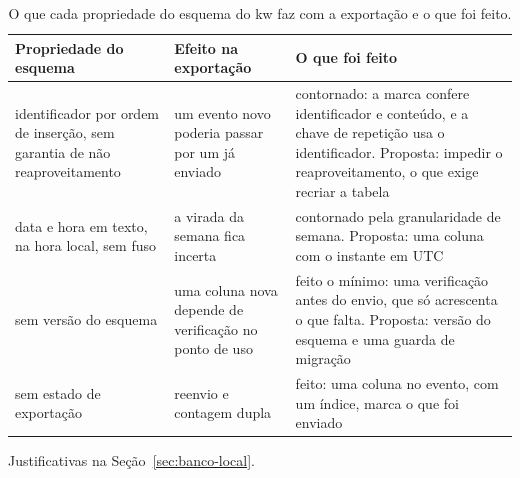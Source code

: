 \begin{table}[!ht]
  \centering
  \footnotesize
  \setlength{\tabcolsep}{4pt}
  \begin{threeparttable}
    \caption{O que cada propriedade do esquema do kw faz com a exportação e o
      que foi feito.}
    \label{tab:esquema}
    \begin{tabular}{@{}>{\raggedright\arraybackslash}p{4.0cm}
                      >{\raggedright\arraybackslash}p{3.8cm}
                      >{\raggedright\arraybackslash}p{6.4cm}@{}}
      \toprule
      Propriedade do esquema & Efeito na exportação & O que foi feito \\
      \midrule
      identificador por ordem de inserção, sem garantia de não reaproveitamento
        & um evento novo poderia passar por um já enviado
        & contornado: a marca confere identificador e conteúdo, e a chave de
          repetição usa o identificador. Proposta: impedir o reaproveitamento,
          o que exige recriar a tabela \\
      \addlinespace
      data e hora em texto, na hora local, sem fuso
        & a virada da semana fica incerta
        & contornado pela granularidade de semana. Proposta: uma coluna com o
          instante em UTC \\
      \addlinespace
      sem versão do esquema
        & uma coluna nova depende de verificação no ponto de uso
        & feito o mínimo: uma verificação antes do envio, que só acrescenta o que
          falta. Proposta: versão do esquema e uma guarda de migração \\
      \addlinespace
      sem estado de exportação
        & reenvio e contagem dupla
        & feito: uma coluna no evento, com um índice, marca o que foi enviado \\
      \bottomrule
    \end{tabular}
    \begin{tablenotes}
      \footnotesize
      \item Justificativas na Seção~\ref{sec:banco-local}.
    \end{tablenotes}
  \end{threeparttable}
\end{table}
